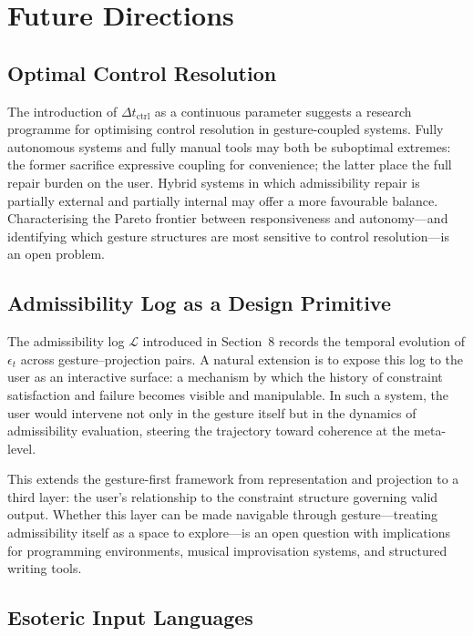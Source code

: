 \documentclass[11pt, a4paper]{article}
\begin{document}
\section{Future Directions}

\subsection{Optimal Control Resolution}

The introduction of $\Delta t_{\mathrm{ctrl}}$ as a continuous parameter
suggests a research programme for optimising control resolution in
gesture-coupled systems. Fully autonomous systems and fully manual tools
may both be suboptimal extremes: the former sacrifice expressive coupling
for convenience; the latter place the full repair burden on the user.
Hybrid systems in which admissibility repair is partially external and
partially internal may offer a more favourable balance. Characterising
the Pareto frontier between responsiveness and autonomy---and identifying
which gesture structures are most sensitive to control resolution---is an
open problem.

\subsection{Admissibility Log as a Design Primitive}

The admissibility log $\mathcal{L}$ introduced in Section~8 records the
temporal evolution of $\epsilon_t$ across gesture--projection pairs. A
natural extension is to expose this log to the user as an interactive
surface: a mechanism by which the history of constraint satisfaction and
failure becomes visible and manipulable. In such a system, the user would
intervene not only in the gesture itself but in the dynamics of
admissibility evaluation, steering the trajectory toward coherence at the
meta-level.

This extends the gesture-first framework from representation and
projection to a third layer: the user's relationship to the constraint
structure governing valid output. Whether this layer can be made
navigable through gesture---treating admissibility itself as a space to
explore---is an open question with implications for programming
environments, musical improvisation systems, and structured writing tools.

\subsection{Esoteric Input Languages}
\end{document}

